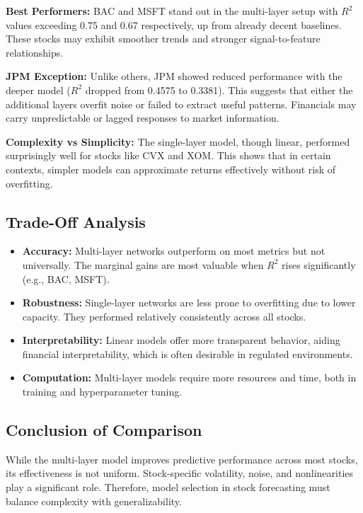 \documentclass[12pt]{article}
\begin{document}
\textbf{Best Performers:} BAC and MSFT stand out in the multi-layer setup with $R^2$ values exceeding 0.75 and 0.67 respectively, up from already decent baselines. These stocks may exhibit smoother trends and stronger signal-to-feature relationships.

\textbf{JPM Exception:} Unlike others, JPM showed reduced performance with the deeper model ($R^2$ dropped from 0.4575 to 0.3381). This suggests that either the additional layers overfit noise or failed to extract useful patterns. Financials may carry unpredictable or lagged responses to market information.

\textbf{Complexity vs Simplicity:} The single-layer model, though linear, performed surprisingly well for stocks like CVX and XOM. This shows that in certain contexts, simpler models can approximate returns effectively without risk of overfitting.

\subsection{Trade-Off Analysis}
\begin{itemize}
  \item \textbf{Accuracy:} Multi-layer networks outperform on most metrics but not universally. The marginal gains are most valuable when $R^2$ rises significantly (e.g., BAC, MSFT).
  \item \textbf{Robustness:} Single-layer networks are less prone to overfitting due to lower capacity. They performed relatively consistently across all stocks.
  \item \textbf{Interpretability:} Linear models offer more transparent behavior, aiding financial interpretability, which is often desirable in regulated environments.
  \item \textbf{Computation:} Multi-layer models require more resources and time, both in training and hyperparameter tuning.
\end{itemize}

\subsection{Conclusion of Comparison}
While the multi-layer model improves predictive performance across most stocks, its effectiveness is not uniform. Stock-specific volatility, noise, and nonlinearities play a significant role. Therefore, model selection in stock forecasting must balance complexity with generalizability.
\end{document}
